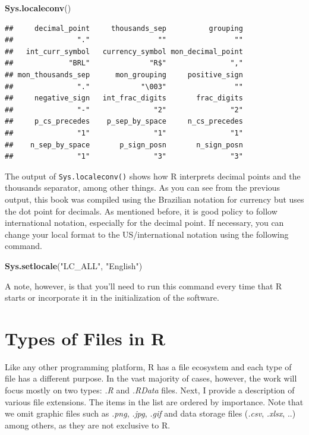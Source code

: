 \documentclass[11pt,]{book}
\newenvironment{Shaded}{\begin{snugshade}}{\end{snugshade}}
\newcommand{\KeywordTok}[1]{\textcolor[rgb]{0.27,0.27,0.27}{\textbf{#1}}}
\newcommand{\StringTok}[1]{\textcolor[rgb]{0.5,0.5,0.5}{#1}}
\newcommand{\NormalTok}[1]{#1}
\begin{document}
\begin{Shaded}
\begin{Highlighting}[]
\KeywordTok{Sys.localeconv}\NormalTok{()}
\end{Highlighting}
\end{Shaded}

\begin{verbatim}
##     decimal_point     thousands_sep          grouping 
##               "."                ""                "" 
##   int_curr_symbol   currency_symbol mon_decimal_point 
##             "BRL"              "R$"               "," 
## mon_thousands_sep      mon_grouping     positive_sign 
##               "."            "\003"                "" 
##     negative_sign   int_frac_digits       frac_digits 
##               "-"               "2"               "2" 
##     p_cs_precedes    p_sep_by_space     n_cs_precedes 
##               "1"               "1"               "1" 
##    n_sep_by_space       p_sign_posn       n_sign_posn 
##               "1"               "3"               "3"
\end{verbatim}

The output of \texttt{Sys.localeconv()} shows how R interprets decimal
points and the thousands separator, among other things. As you can see
from the previous output, this book was compiled using the Brazilian
notation for currency but uses the dot point for decimals. As mentioned
before, it is good policy to follow international notation, especially
for the decimal point. If necessary, you can change your local format to
the US/international notation using the following command.

\begin{Shaded}
\begin{Highlighting}[]
\KeywordTok{Sys.setlocale}\NormalTok{(}\StringTok{"LC_ALL"}\NormalTok{, }\StringTok{"English"}\NormalTok{)}
\end{Highlighting}
\end{Shaded}

A note, however, is that you'll need to run this command every time that
R starts or incorporate it in the initialization of the software.

\section{Types of Files in R}\label{types-of-files-in-r}

Like any other programming platform, R has a file ecosystem and each
type of file has a different purpose. In the vast majority of cases,
however, the work will focus mostly on two types: \emph{.R} and
\emph{.RData} files. Next, I provide a description of various file
extensions. The items in the list are ordered by importance. Note that
we omit graphic files such as \emph{.png}, \emph{.jpg}, \emph{.gif} and
data storage files (\emph{.csv}, \emph{.xlsx}, ..) among others, as they
are not exclusive to R.  
\end{document}
